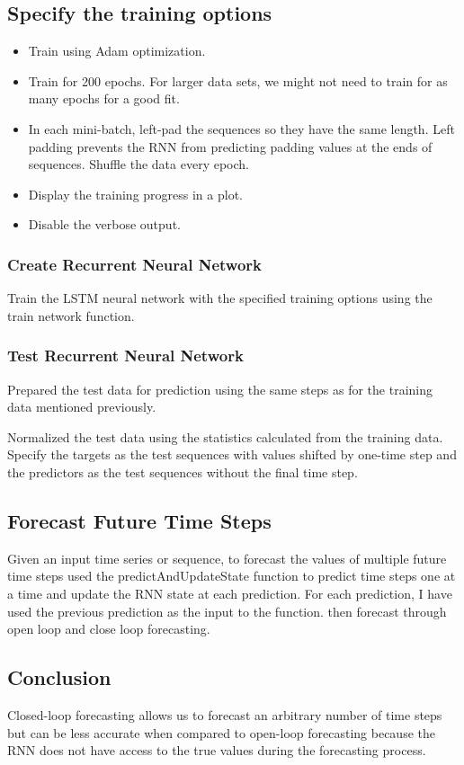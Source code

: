 \documentclass{article}
\begin{document}
\subsection{Specify the training options}
\begin{itemize}
    \item Train using Adam optimization.
\item Train for 200 epochs. For larger data sets, we might not need to train for as many epochs for a good fit.
\item In each mini-batch, left-pad the sequences so they have the same length. Left padding prevents the RNN from predicting padding values at the ends of sequences.
Shuffle the data every epoch.
\item Display the training progress in a plot.
\item Disable the verbose output.
\end{itemize}
\subsubsection{Create Recurrent Neural Network}
Train the LSTM neural network with the specified training options using the train network function.
\subsubsection{Test Recurrent Neural Network}
Prepared the test data for prediction using the same steps as for the training data mentioned previously.

Normalized the test data using the statistics calculated from the training data. Specify the targets as the test sequences with values shifted by one-time step and the predictors as the test sequences without the final time step.
\subsection{
Forecast Future Time Steps
}
Given an input time series or sequence, to forecast the values of multiple future time steps used the predictAndUpdateState function to predict time steps one at a time and update the RNN state at each prediction. For each prediction, I have used the previous prediction as the input to the function. then forecast through open loop and close loop forecasting.
\subsection{Conclusion}
Closed-loop forecasting allows us to forecast an arbitrary number of time steps but can be less accurate when compared to open-loop forecasting because the RNN does not have access to the true values during the forecasting process.
\end{document}
